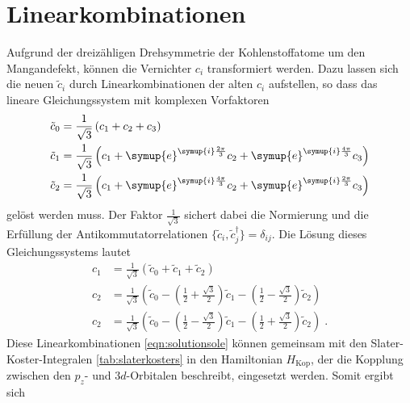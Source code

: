 \section{Linearkombinationen}
Aufgrund der dreizähligen Drehsymmetrie der Kohlenstoffatome um den Mangandefekt, können die Vernichter $c_i$
transformiert werden.
Dazu lassen sich die neuen $\tilde{c}_i$ durch Linearkombinationen der alten $c_i$ aufstellen, so dass das lineare Gleichungssystem mit komplexen Vorfaktoren 
\begin{equation}
    \begin{aligned}
    \tilde{c}_0 &= \frac{1}{\sqrt{3}}\left (c_1 + c_2 + c_3 \right ) \\
    \tilde{c}_1 &= \frac{1}{\sqrt{3}}\left (c_1+ \symup{e}^{\symup{i}\frac{2\pi}{3}} c_2 + \symup{e}^{\symup{i}\frac{4\pi}{3}}c_3 \right ) \\
    \tilde{c}_2 &= \frac{1}{\sqrt{3}}\left (c_1 + \symup{e}^{\symup{i}\frac{4\pi}{3}} c_2 + \symup{e}^{\symup{i}\frac{2\pi}{3}}c_3 \right ) \label{eqn:sole} 
    \end{aligned}
\end{equation}
gelöst werden muss. 
Der Faktor $\frac{1}{\sqrt{3}}$ sichert dabei die Normierung und die Erfüllung der Antikommutatorrelationen $\{\tilde{c}_i,\tilde{c}^\dagger_j\} = \delta_{ij}$.
Die Lösung dieses Gleichungssystems lautet 
\begin{equation}
    \begin{aligned}
    c_1 &= \frac{1}{\sqrt{3}}\left (\tilde{c}_0 + \tilde{c}_1 + \tilde{c}_2 \right ) \\
    c_2 &= \frac{1}{\sqrt{3}}\left (\tilde{c}_0 - \left(\frac{1}{2} + \frac{{\sqrt{3}}}{2} \right) \tilde{c}_1 - \left ( \frac{1}{2} - \frac{{\sqrt{3}}}{2} \right ) \tilde{c}_2 \right ) \\
    c_2 &= \frac{1}{\sqrt{3}}\left (\tilde{c}_0 - \left(  \frac{1}{2} - \frac{{\sqrt{3}}}{2} \right) \tilde{c}_1 - \left ( \frac{1}{2} + \frac{{\sqrt{3}}}{2} \right ) \tilde{c}_2 \right ) 
    \; \text{.}   \label{eqn:solutionsole}
    \end{aligned}
\end{equation}
Diese Linearkombinationen \eqref{eqn:solutionsole} können gemeinsam mit den Slater-Koster-Integralen \ref{tab:slaterkosters} in den Hamiltonian $H_\text{Kop}$, der die Kopplung 
zwischen den $p_z$- und $3d$-Orbitalen beschreibt, eingesetzt werden.
Somit ergibt sich 
